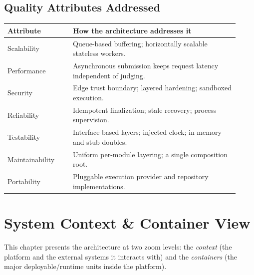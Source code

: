 \documentclass[12pt,a4paper,oneside]{report}
\begin{document}
\section{Quality Attributes Addressed}
\begin{longtable}{@{}p{0.26\linewidth} p{0.66\linewidth}@{}}
\toprule
\textbf{Attribute} & \textbf{How the architecture addresses it}\\
\midrule
\endhead
Scalability & Queue-based buffering; horizontally scalable stateless workers.\\
Performance & Asynchronous submission keeps request latency independent of judging.\\
Security & Edge trust boundary; layered hardening; sandboxed execution.\\
Reliability & Idempotent finalization; stale recovery; process supervision.\\
Testability & Interface-based layers; injected clock; in-memory and stub doubles.\\
Maintainability & Uniform per-module layering; a single composition root.\\
Portability & Pluggable execution provider and repository implementations.\\
\bottomrule
\end{longtable}

\chapter{System Context \& Container View}
This chapter presents the architecture at two zoom levels: the \emph{context}
(the platform and the external systems it interacts with) and the
\emph{containers} (the major deployable/runtime units inside the platform).
\end{document}
